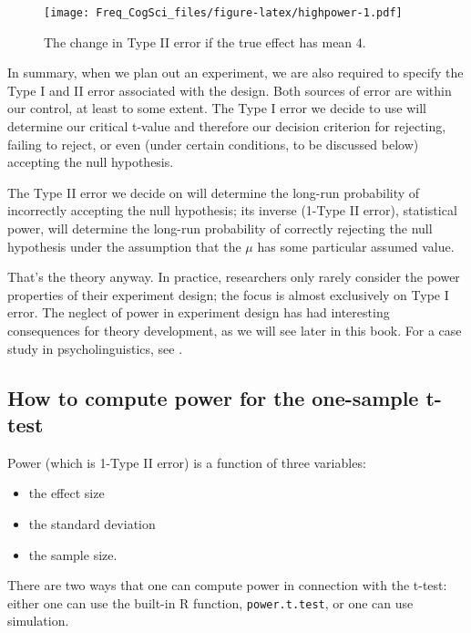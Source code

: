 \documentclass[12pt,]{krantz}
\providecommand{\tightlist}{%
  \setlength{\itemsep}{0pt}\setlength{\parskip}{0pt}}
\begin{document}
\begin{figure}
\centering
\texttt{[image: Freq\_CogSci\_files/figure-latex/highpower-1.pdf]}
\caption{\label{fig:highpower}The change in Type II error if the true effect has mean 4.}
\end{figure}

In summary, when we plan out an experiment, we are also required to specify the Type I and II error associated with the design. Both sources of error are within our control, at least to some extent. The Type I error we decide to use will determine our critical t-value and therefore our decision criterion for rejecting, failing to reject, or even (under certain conditions, to be discussed below) accepting the null hypothesis.

The Type II error we decide on will determine the long-run probability of incorrectly accepting the null hypothesis; its inverse (1-Type II error), statistical power, will determine the long-run probability of correctly rejecting the null hypothesis under the assumption that the \(\mu\) has some particular assumed value.

That's the theory anyway. In practice, researchers only rarely consider the power properties of their experiment design; the focus is almost exclusively on Type I error. The neglect of power in experiment design has had interesting consequences for theory development, as we will see later in this book. For a case study in psycholinguistics, see \citet{VasishthMertzenJaegerGelman2018}.

\hypertarget{how-to-compute-power-for-the-one-sample-t-test}{%
\subsection{How to compute power for the one-sample t-test}\label{how-to-compute-power-for-the-one-sample-t-test}}

Power (which is 1-Type II error) is a function of three variables:

\begin{itemize}
\tightlist
\item
  the effect size
\item
  the standard deviation
\item
  the sample size.
\end{itemize}

There are two ways that one can compute power in connection with the t-test: either one can use the built-in R function, \texttt{power.t.test}, or one can use simulation.
\end{document}
